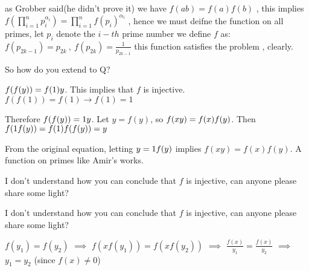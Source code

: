 \begin{solution}
	as Grobber said(he didn't prove it) we have $ f(ab) = f(a)f(b)$ , this  implies $ f(\prod_{i = 1}^np_i^{\alpha_i}) = \prod_{i = 1}^nf(p_i)^{\alpha_i}$ , hence we must deifne the function on all primes, let $ p_i$ denote the $ i - th$ prime number we define $ f$ as:
$ f(p_{2k - 1}) = p_{2k}\ ,\ f(p_{2k}) = \frac {1}{p_{2k - 1}}$
this function satisfies the problem , clearly.
\end{solution}



\begin{solution}
	So how do you extend to Q?
\end{solution}



\begin{solution}
	$ f(f(y)) = f(1)\/y$. This implies that $ f$ is injective. $ f(f(1)) = f(1) \longrightarrow f(1) = 1$

Therefore $ f(f(y)) = 1\/y$. Let $ y=f(y)$, so $ f(x\/y) = f(x)\/f(y)$. Then $ f(1\/f(y)) = f(1)\/f(f(y)) = y$

From the original equation, letting $ y=1\/f(y)$ implies $ f(xy) = f(x)f(y)$. A function on primes like Amir's works.
\end{solution}



\begin{solution}
	I don't understand how you can conclude that $ f$ is injective, can anyone please share some light?
\end{solution}



\begin{solution}
	\begin{tcolorbox}I don't understand how you can conclude that $ f$ is injective, can anyone please share some light?\end{tcolorbox}
$ f(y_1) = f(y_2)$ $ \implies$ $ f(xf(y_1)) = f(xf(y_2))$ $ \implies$ $ \frac {f(x)}{y_1} = \frac {f(x)}{y_2}$ $ \implies$ $ y_1 = y_2$ (since $ f(x)\neq 0$)
\end{solution}



